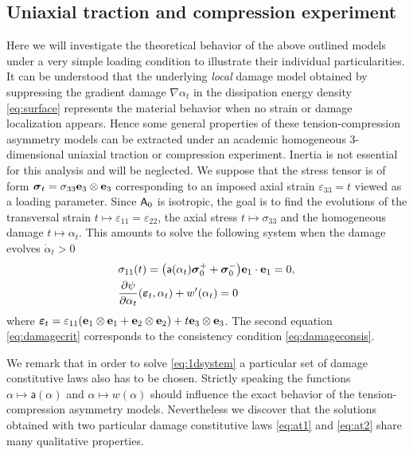 \subsection{Uniaxial traction and compression experiment} \label{sec:uniaxial}
Here we will investigate the theoretical behavior of the above outlined models under a very simple loading condition to illustrate their individual particularities. It can be understood that the underlying \emph{local} damage model obtained by suppressing the gradient damage $\nabla\alpha_t$ in the dissipation energy density \eqref{eq:surface} represents the material behavior when no strain or damage localization appears. Hence some general properties of these tension-compression asymmetry models can be extracted under an academic homogeneous 3-dimensional uniaxial traction or compression experiment. Inertia is not essential for this analysis and will be neglected. We suppose that the stress tensor is of form $\sig_t=\sigma_{33}\vec{e}_3\otimes\vec{e}_3$ corresponding to an imposed axial strain $\varepsilon_{33}=t$ viewed as a loading parameter. Since $\mathsf{A}_0$ is isotropic, the goal is to find the evolutions of the transversal strain $t\mapsto\varepsilon_{11}=\varepsilon_{22}$, the axial stress $t\mapsto\sigma_{33}$ and the homogeneous damage $t\mapsto \alpha_t$. This amounts to solve the following system when the damage evolves $\dot{\alpha}_t>0$
\begin{subequations} \label{eq:1dsystem}
\begin{align}
& \sigma_{11}(t)=\bigl(\mathsf{a}(\alpha_t)\sig_0^++\sig_0^-\bigr)\vec{e}_1\cdot\vec{e}_1=0, \label{eq:eps11as33} \\
& \frac{\partial\psi}{\partial\alpha_t}(\eps_t,\alpha_t)+w'(\alpha_t)=0 \label{eq:damagecrit}
\end{align}
\end{subequations}
where $\eps_t=\varepsilon_{11}(\vec{e}_1\otimes\vec{e}_1+\vec{e}_2\otimes\vec{e}_2)+t\vec{e}_3\otimes\vec{e}_3$. The second equation \eqref{eq:damagecrit} corresponds to the consistency condition \eqref{eq:damageconsis}.

We remark that in order to solve \eqref{eq:1dsystem} a particular set of damage constitutive laws also has to be chosen. Strictly speaking the functions $\alpha\mapsto \mathsf{a}(\alpha)$ and $\alpha\mapsto w(\alpha)$ should influence the exact behavior of the tension-compression asymmetry models. Nevertheless we discover that the solutions obtained with two particular damage constitutive laws \eqref{eq:at1} and \eqref{eq:at2} share many qualitative properties.

